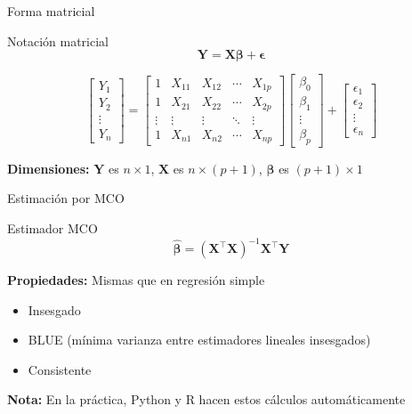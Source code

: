 \documentclass[aspectratio=169]{beamer}
\begin{document}
\begin{frame}{Forma matricial}
\begin{block}{Notación matricial}
\[
\mathbf{Y} = \mathbf{X}\boldsymbol{\beta} + \boldsymbol{\epsilon}
\]
\end{block}

\[
\begin{bmatrix} Y_1 \\ Y_2 \\ \vdots \\ Y_n \end{bmatrix} = 
\begin{bmatrix} 
1 & X_{11} & X_{12} & \cdots & X_{1p} \\
1 & X_{21} & X_{22} & \cdots & X_{2p} \\
\vdots & \vdots & \vdots & \ddots & \vdots \\
1 & X_{n1} & X_{n2} & \cdots & X_{np}
\end{bmatrix}
\begin{bmatrix} \beta_0 \\ \beta_1 \\ \vdots \\ \beta_p \end{bmatrix} +
\begin{bmatrix} \epsilon_1 \\ \epsilon_2 \\ \vdots \\ \epsilon_n \end{bmatrix}
\]

\vspace{0.3cm}
\textbf{Dimensiones:} $\mathbf{Y}$ es $n \times 1$, $\mathbf{X}$ es $n \times (p+1)$, $\boldsymbol{\beta}$ es $(p+1) \times 1$
\end{frame}

\begin{frame}{Estimación por MCO}
\begin{block}{Estimador MCO}
\[
\hat{\boldsymbol{\beta}} = (\mathbf{X}^\top \mathbf{X})^{-1} \mathbf{X}^\top \mathbf{Y}
\]
\end{block}

\vspace{0.5cm}
\textbf{Propiedades:} Mismas que en regresión simple
\begin{itemize}
    \item Insesgado
    \item BLUE (mínima varianza entre estimadores lineales insesgados)
    \item Consistente
\end{itemize}

\vspace{0.5cm}
\textbf{Nota:} En la práctica, Python y R hacen estos cálculos automáticamente
\end{frame}
\end{document}
